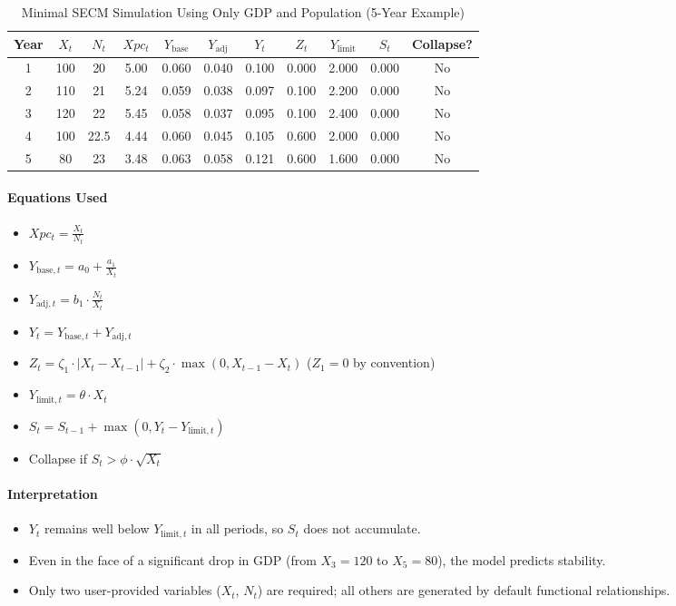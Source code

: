 \documentclass[12pt]{report}
\begin{document}
\begin{table}[H]
\centering
\caption{Minimal SECM Simulation Using Only GDP and Population (5-Year Example)}
\footnotesize
\begin{tabular}{|c|c|c|c|c|c|c|c|c|c|c|}
\hline
\textbf{Year} & $X_t$ & $N_t$ & $Xpc_t$ & $Y_{\text{base}}$ & $Y_{\text{adj}}$ & $Y_t$ & $Z_t$ & $Y_{\text{limit}}$ & $S_t$ & Collapse? \\
\hline
1 & 100  & 20   & 5.00 & 0.060 & 0.040 & 0.100 & 0.000 & 2.000 & 0.000 & No \\
2 & 110  & 21   & 5.24 & 0.059 & 0.038 & 0.097 & 0.100 & 2.200 & 0.000 & No \\
3 & 120  & 22   & 5.45 & 0.058 & 0.037 & 0.095 & 0.100 & 2.400 & 0.000 & No \\
4 & 100  & 22.5 & 4.44 & 0.060 & 0.045 & 0.105 & 0.600 & 2.000 & 0.000 & No \\
5 & 80   & 23   & 3.48 & 0.063 & 0.058 & 0.121 & 0.600 & 1.600 & 0.000 & No \\
\hline
\end{tabular}
\end{table}

\paragraph{Equations Used}
\begin{itemize}
    \item $Xpc_t = \frac{X_t}{N_t}$
    \item $Y_{\text{base},t} = a_0 + \frac{a_1}{X_t}$
    \item $Y_{\text{adj},t} = b_1 \cdot \frac{N_t}{X_t}$
    \item $Y_t = Y_{\text{base},t} + Y_{\text{adj},t}$
    \item $Z_t = \zeta_1 \cdot |X_t - X_{t-1}| + \zeta_2 \cdot \max(0, X_{t-1} - X_t)$ \quad ($Z_1 = 0$ by convention)
    \item $Y_{\text{limit},t} = \theta \cdot X_t$
    \item $S_t = S_{t-1} + \max(0, Y_t - Y_{\text{limit},t})$
    \item Collapse if $S_t > \phi \cdot \sqrt{X_t}$
\end{itemize}

\paragraph{Interpretation}
\begin{itemize}
    \item $Y_t$ remains well below $Y_{\text{limit},t}$ in all periods, so $S_t$ does not accumulate.
    \item Even in the face of a significant drop in GDP (from $X_3 = 120$ to $X_5 = 80$), the model predicts stability.
    \item Only two user-provided variables ($X_t$, $N_t$) are required; all others are generated by default functional relationships.
\end{itemize}
\end{document}
